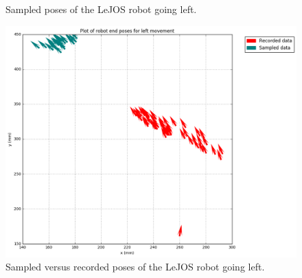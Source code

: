 \documentclass[paper=a4, fontsize=11pt]{scrartcl} %
\begin{document}
\begin{figure}[H]
\begin{minipage}{0.5\textwidth}
            \caption{Sampled poses of the LeJOS robot going left.}
        \end{minipage}
    \end{figure}

    \begin{figure}[H]
        \centering
        \includegraphics[width=1\textwidth]{images/poses_compare_left.png}
        \caption{Sampled versus recorded poses of the LeJOS robot going left.}
    \end{figure}
\end{document}

